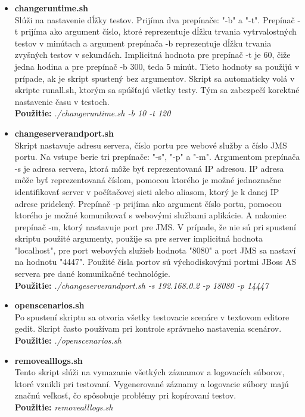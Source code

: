 \documentclass[12pt,oneside,final]{fithesis-utf8}
\newcommand\underscore[1]{\underline{\hspace{8pt}}}
\begin{document}
\begin{itemize}
\item \textbf{change\underscore{}runtime.sh}\\
Slúži na nastavenie dĺžky testov. Prijíma dva prepínače: "{}-b"{} a "{}-t"{}. Prepínač -t prijíma ako argument číslo, ktoré reprezentuje dĺžku trvania vytrvalostných testov v minútach a argument prepínača -b reprezentuje dĺžku trvania zvyšných testov v sekundách. Implicitná hodnota pre prepínač -t je 60, čiže jedna hodina a pre prepínač -b 300, teda 5 minút. Tieto hodnoty sa použijú v prípade, ak je skript spustený bez argumentov. Skript sa automaticky volá v skripte run\underscore{}all.sh, ktorým sa spúšťajú všetky testy. Tým sa zabezpečí korektné nastavenie času v testoch.\\
\textbf{Použitie:} \textit{./change\underscore{}runtime.sh -b 10 -t 120}

\item \textbf{change\underscore{}server\underscore{}and\underscore{}port.sh}\\
Skript nastavuje adresu servera, číslo portu pre webové služby a číslo JMS portu. Na vstupe berie tri prepínače: "{}-s"{}, "{}-p"{} a "{}-m"{}. Argumentom prepínača -s je adresa servera, ktorá môže byť reprezentovaná IP adresou. IP adresa môže byť reprezentovaná číslom, pomocou ktorého je možné jednoznačne identifikovať server v počítačovej sieti alebo aliasom, ktorý je k danej IP adrese pridelený. Prepínač -p prijíma ako argument číslo portu, pomocou ktorého je možné komunikovať s webovými službami aplikácie. A nakoniec prepínač -m, ktorý nastavuje port pre JMS. V prípade, že nie sú pri spustení skriptu použité argumenty, použije sa pre server implicitná hodnota "{}localhost"{}, pre port webových služieb hodnota "{}8080"{} a port JMS sa nastaví na hodnotu "{}4447"{}. Použité čísla portov sú východiskovými portmi JBoss AS servera pre dané komunikačné technológie.\\
\textbf{Použitie:} \textit{./change\underscore{}server\underscore{}and\underscore{}port.sh -s 192.168.0.2 -p 18080 -p 14447}

\item \textbf{open\underscore{}scenarios.sh}\\
Po spustení skriptu sa otvoria všetky testovacie scenáre v textovom editore gedit. Skript často používam pri kontrole správneho nastavenia scenárov.\\
\textbf{Použitie:} \textit{./open\underscore{}scenarios.sh}


\item \textbf{remove\underscore{}all\underscore{}logs.sh}\\
Tento skript slúži na vymazanie všetkých záznamov a logovacích súborov, ktoré vznikli pri testovaní. Vygenerované záznamy a logovacie súbory majú značnú veľkosť, čo spôsobuje problémy pri kopírovaní testov.\\
\textbf{Použitie:} \textit{remove\underscore{}all\underscore{}logs.sh}


\end{itemize}
\end{document}

